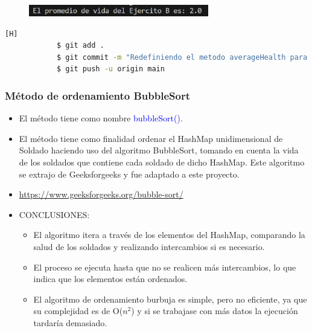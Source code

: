 \documentclass{article}
\begin{document}
        \begin{figure}[H]
            \centering
            \includegraphics[width=0.7\textwidth,keepaspectratio]{img/averageHealth2.png}
            \caption{}
        \end{figure}

        \begin{lstlisting}[language=bash,caption={Commit \href{https://github.com/hernanchoquehuanca/fp2-23b/commit/56d85759e5cc3a495151cbcfdc5e9a5e96a60f0d}{56d8575} - \href{https://github.com/hernanchoquehuanca/fp2-23b/commit/4cec82f07dd2b540f0c3acfd6313f3565ec252a2}{4cec82f}: Se agregó el método averageHealth y sumHealth, siendo el segundo de utilidad para el primero}][H]
    		$ git add .
    		$ git commit -m "Redefiniendo el metodo averageHealth para ahora trabajar con HashMap, cambiando solamente el parametro del mismo"
    		$ git push -u origin main
    	\end{lstlisting}
        
        \newpage
        \subsubsection{Método de ordenamiento BubbleSort}

        \begin{itemize}
            \item El método tiene como nombre \textcolor{blue}{bubbleSort()}.
            \item El método tiene como finalidad ordenar el HashMap unidimensional de Soldado haciendo uso del algoritmo BubbleSort, tomando en cuenta la vida de los soldados que contiene cada soldado de dicho HashMap. Este algoritmo se extrajo de Geeksforgeeks y fue adaptado a este proyecto.
            \item \href{https://www.geeksforgeeks.org/bubble-sort/}{https://www.geeksforgeeks.org/bubble-sort/}
            \item CONCLUSIONES:
            \begin{itemize}
                \item El algoritmo itera a través de los elementos del HashMap, comparando la salud de los soldados y realizando intercambios si es necesario.
                \item El proceso se ejecuta hasta que no se realicen más intercambios, lo que indica que los elementos están ordenados.
                \item El algoritmo de ordenamiento burbuja es simple, pero no eficiente, ya que su complejidad es de O($n^2$) y si se trabajase con más datos la ejecución tardaría demasiado.
            \end{itemize}
        \end{itemize}
\end{document}
